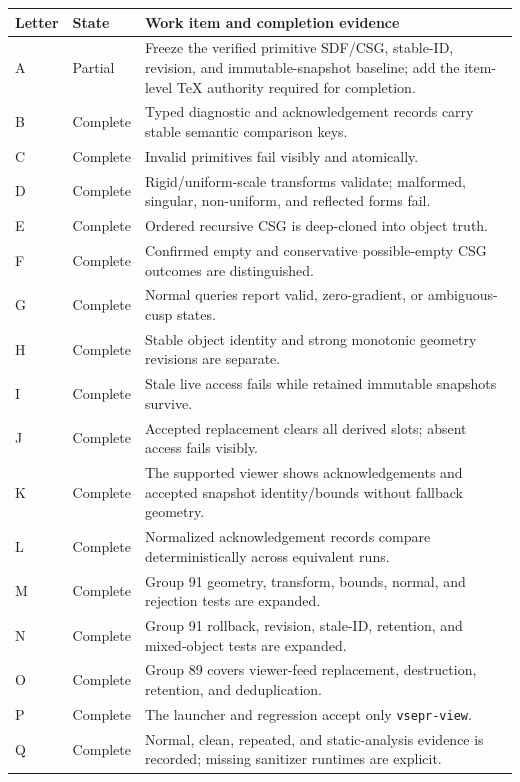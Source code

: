 \documentclass[10pt]{article}
\begin{document}
\small
\begin{tabularx}{\textwidth}{@{}l l X@{}}
\toprule
Letter & State & Work item and completion evidence \\
\midrule
A & Partial & Freeze the verified primitive SDF/CSG, stable-ID, revision, and immutable-snapshot baseline; add the item-level TeX authority required for completion. \\
B & Complete & Typed diagnostic and acknowledgement records carry stable semantic comparison keys. \\
C & Complete & Invalid primitives fail visibly and atomically. \\
D & Complete & Rigid/uniform-scale transforms validate; malformed, singular, non-uniform, and reflected forms fail. \\
E & Complete & Ordered recursive CSG is deep-cloned into object truth. \\
F & Complete & Confirmed empty and conservative possible-empty CSG outcomes are distinguished. \\
G & Complete & Normal queries report valid, zero-gradient, or ambiguous-cusp states. \\
H & Complete & Stable object identity and strong monotonic geometry revisions are separate. \\
I & Complete & Stale live access fails while retained immutable snapshots survive. \\
J & Complete & Accepted replacement clears all derived slots; absent access fails visibly. \\
K & Complete & The supported viewer shows acknowledgements and accepted snapshot identity/bounds without fallback geometry. \\
L & Complete & Normalized acknowledgement records compare deterministically across equivalent runs. \\
M & Complete & Group 91 geometry, transform, bounds, normal, and rejection tests are expanded. \\
N & Complete & Group 91 rollback, revision, stale-ID, retention, and mixed-object tests are expanded. \\
O & Complete & Group 89 covers viewer-feed replacement, destruction, retention, and deduplication. \\
P & Complete & The launcher and regression accept only \texttt{vsepr-view}. \\
Q & Complete & Normal, clean, repeated, and static-analysis evidence is recorded; missing sanitizer runtimes are explicit. \\

\end{tabularx}
\end{document}
